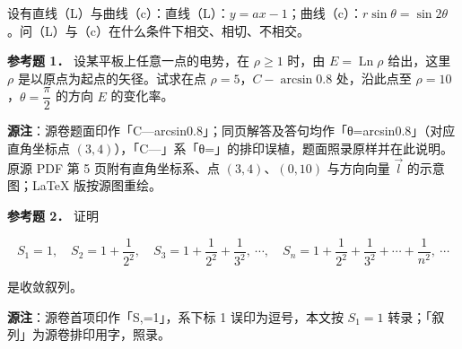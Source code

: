 \begin{question}
设有直线（L）与曲线（c）：直线（L）：$y=ax-1$；曲线（c）：$r\sin\theta=\sin2\theta$。问（L）与（c）在什么条件下相交、相切、不相交。

\textbf{参考题 1．} 设某平板上任意一点的电势，在 $\rho\geqslant1$ 时，由 $E=\operatorname{Ln}\rho$ 给出，这里 $\rho$ 是以原点为起点的矢径。试求在点 $\rho=5$，$C-\arcsin 0.8$ 处，沿此点至 $\rho=10$，$\theta=\dfrac{\pi}{2}$ 的方向 $E$ 的变化率。

\begin{gktip}
\textbf{源注}：源卷题面印作「C—arcsin0.8」；同页解答及答句均作「θ=arcsin0.8」（对应直角坐标点 $(3,4)$），「C—」系「θ=」的排印误植，题面照录原样并在此说明。
原源 PDF 第 5 页附有直角坐标系、点 $(3,4)$、$(0,10)$ 与方向向量 $\vec{l}$ 的示意图；LaTeX 版按源图重绘。
\end{gktip}
\nopagebreak[4]
\begin{center}\end{center}
\nopagebreak[4]
\textbf{参考题 2．} 证明

\nopagebreak[4]
\[
S_{1}=1,\quad S_{2}=1+\frac{1}{2^{2}},\quad S_{3}=1+\frac{1}{2^{2}}+\frac{1}{3^{2}},\ \cdots,\quad S_{n}=1+\frac{1}{2^{2}}+\frac{1}{3^{2}}+\cdots+\frac{1}{n^{2}},\ \cdots
\]

是收敛叙列。

\begin{gktip}
\textbf{源注}：源卷首项印作「S,=1」，系下标 1 误印为逗号，本文按 $S_{1}=1$ 转录；「叙列」为源卷排印用字，照录。
\end{gktip}

\end{question}
